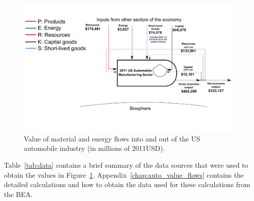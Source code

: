 \begin{figure}[!ht]
\centering
\includegraphics[width=1.0\linewidth]{Part_2/Chapter_Values/images/PERKS_basic_unit_value_auto_ind.pdf}
\caption[Value of material and energy flows 
into and out of the US automobile industry]{Value 
of material and energy flows into and out of the 
US automobile industry (in millions of 2011USD).}
\label{fig:PERKS_value_auto_ind}
\end{figure}

Table~\ref{tab:data} contains a brief summary  
of the data sources that were used 
to obtain the values in Figure~\ref{fig:PERKS_value_auto_ind}. 
Appendix~\ref{chap:auto_value_flows} contains the
detailed calculations and how to obtain the data used for these calculations 
from the BEA.

